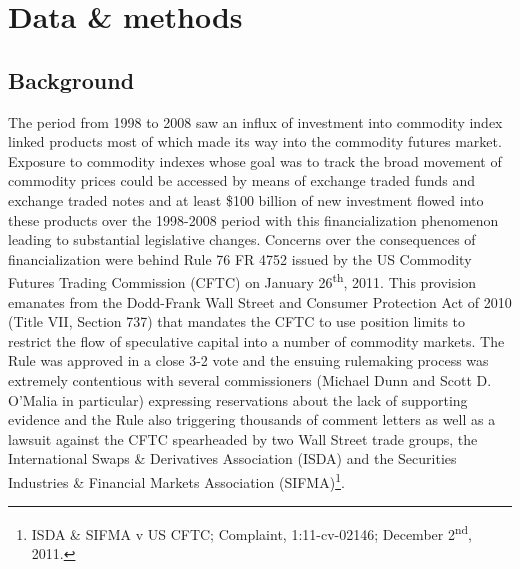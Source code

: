 \documentclass[12pt,]{article}
\let\rmarkdownfootnote\footnote%
\def\footnote{\protect\rmarkdownfootnote}
\begin{document}
\hypertarget{data-methods}{%
\section{Data \& methods}\label{data-methods}}

\hypertarget{background}{%
\subsection{Background}\label{background}}

The period from 1998 to 2008 saw an influx of investment into commodity
index linked products most of which made its way into the commodity
futures market. Exposure to commodity indexes whose goal was to track
the broad movement of commodity prices could be accessed by means of
exchange traded funds and exchange traded notes and at least \$100
billion of new investment flowed into these products over the 1998-2008
period with this financialization phenomenon leading to substantial
legislative changes. Concerns over the consequences of financialization
were behind Rule 76 FR 4752 issued by the US Commodity Futures Trading
Commission (CFTC) on January 26\textsuperscript{th}, 2011. This
provision emanates from the Dodd-Frank Wall Street and Consumer
Protection Act of 2010 (Title VII, Section 737) that mandates the CFTC
to use position limits to restrict the flow of speculative capital into
a number of commodity markets. The Rule was approved in a close 3-2 vote
and the ensuing rulemaking process was extremely contentious with
several commissioners (Michael Dunn and Scott D. O'Malia in particular)
expressing reservations about the lack of supporting evidence and the
Rule also triggering thousands of comment letters as well as a lawsuit
against the CFTC spearheaded by two Wall Street trade groups, the
International Swaps \& Derivatives Association (ISDA) and the Securities
Industries \& Financial Markets Association (SIFMA)\footnote{ISDA \&
  SIFMA v US CFTC; Complaint, 1:11-cv-02146; December
  2\textsuperscript{nd}, 2011.}.
\end{document}
